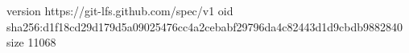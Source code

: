 version https://git-lfs.github.com/spec/v1
oid sha256:d1f18cd29d179d5a09025476cc4a2cebabf29796da4c82443d1d9cbdb9882840
size 11068
